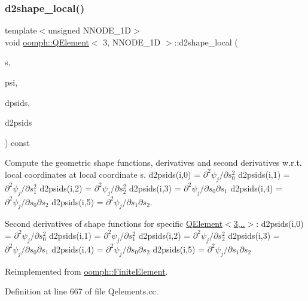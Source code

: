 \subsubsection{\texorpdfstring{d2shape\+\_\+local()}{d2shape\_local()}}
{\footnotesize\ttfamily template$<$unsigned N\+N\+O\+D\+E\+\_\+1D$>$ \\
void \hyperlink{classoomph_1_1QElement}{oomph\+::\+Q\+Element}$<$ 3, N\+N\+O\+D\+E\+\_\+1D $>$\+::d2shape\+\_\+local (\begin{DoxyParamCaption}\item[{const \hyperlink{classoomph_1_1Vector}{Vector}$<$ double $>$ \&}]{s,  }\item[{\hyperlink{classoomph_1_1Shape}{Shape} \&}]{psi,  }\item[{\hyperlink{classoomph_1_1DShape}{D\+Shape} \&}]{dpsids,  }\item[{\hyperlink{classoomph_1_1DShape}{D\+Shape} \&}]{d2psids }\end{DoxyParamCaption}) const\hspace{0.3cm}{\ttfamily [virtual]}}



Compute the geometric shape functions, derivatives and second derivatives w.\+r.\+t. local coordinates at local coordinate s. d2psids(i,0) = $ \partial^2 \psi_j / \partial s_0^2 $ d2psids(i,1) = $ \partial^2 \psi_j / \partial s_1^2 $ d2psids(i,2) = $ \partial^2 \psi_j / \partial s_2^2 $ d2psids(i,3) = $ \partial^2 \psi_j / \partial s_0 \partial s_1 $ d2psids(i,4) = $ \partial^2 \psi_j / \partial s_0 \partial s_2 $ d2psids(i,5) = $ \partial^2 \psi_j / \partial s_1 \partial s_2 $. 

Second derivatives of shape functions for specific \hyperlink{classoomph_1_1QElement_3_013_00_01NNODE__1D_01_4_a67a7cfffb80e609cdfd1ec534a9c19bd}{Q\+Element$<$3,..$>$}\+: d2psids(i,0) = $ \partial^2 \psi_j / \partial s_0^2 $ d2psids(i,1) = $ \partial^2 \psi_j / \partial s_1^2 $ d2psids(i,2) = $ \partial^2 \psi_j / \partial s_2^2 $ d2psids(i,3) = $ \partial^2 \psi_j / \partial s_0 \partial s_1 $ d2psids(i,4) = $ \partial^2 \psi_j / \partial s_0 \partial s_2 $ d2psids(i,5) = $ \partial^2 \psi_j / \partial s_1 \partial s_2 $ 

Reimplemented from \hyperlink{classoomph_1_1FiniteElement_a53e5051582d9da07b9d35da9debd0cd7}{oomph\+::\+Finite\+Element}.



Definition at line 667 of file Qelements.\+cc.



